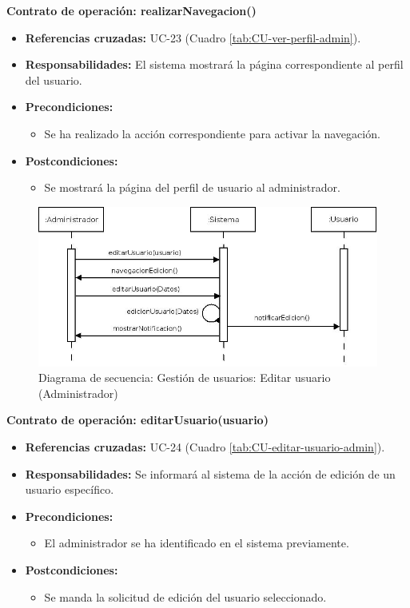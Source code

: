 \textbf{Contrato de operación: realizarNavegacion()}
\begin{itemize}
\item \textbf{Referencias cruzadas:} UC-23 (Cuadro \ref{tab:CU-ver-perfil-admin}).
\item \textbf{Responsabilidades:} El sistema mostrará la página correspondiente al perfil del usuario.
\item \textbf{Precondiciones:} 
 \begin{itemize}
\item Se ha realizado la acción correspondiente para activar la navegación.
\end {itemize}
\item \textbf{Postcondiciones:} 
 \begin{itemize}
\item Se mostrará la página del perfil de usuario al administrador.
\end {itemize}
\end {itemize}


\vspace{10mm}

\begin{figure}[H]
\centering
  \includegraphics[scale=.50]{img/secuencias/gestion-usuarios-editar-usuario-administrador.jpeg}
  \caption{Diagrama de secuencia: Gestión de usuarios: Editar usuario (Administrador)}
  \label{fig:secuencia-gestion-usuarios-editar-usuario-administrador}
\end{figure}

\textbf{Contrato de operación: editarUsuario(usuario)}
\begin{itemize}
\item \textbf{Referencias cruzadas:} UC-24 (Cuadro \ref{tab:CU-editar-usuario-admin}).
\item \textbf{Responsabilidades:} Se informará al sistema de la acción de edición de un usuario específico.
\item \textbf{Precondiciones:} 
 \begin{itemize}
\item El administrador se ha identificado en el sistema previamente.
\end {itemize}
\item \textbf{Postcondiciones:} 
 \begin{itemize}
\item Se manda la solicitud de edición del usuario seleccionado.
\end {itemize}
\end {itemize}

